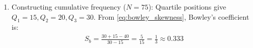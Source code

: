 \begin{enumerate}[label=\thesubsection.\arabic*, ref=\thesubsection.\theenumi]
\begin{enumerate}[label=\brak{\alph*}]
		Applying the inverse Laplace transform from \eqref{eq:inv_laplace_pairs} and \eqref{eq:laplace_second_order}:
		\begin{align}
			y\brak{t} = \brak{-\frac{1}{4} + 2e^t - \frac{3}{4}e^{2t} + \frac{1}{2}t e^{2t}}u\brak{t}
		\end{align}
		Substituting $t = \ln x$ ($e^t = x$, $x \ge 1$) yields:
		\begin{align}
			y\brak{x} = \frac{x^2}{2}\log x - \frac{3x^2}{4} + 2x - \frac{1}{4}, \quad x \ge 1
		\end{align}
		\item Constructing cumulative frequency ($N = 75$):
		Quartile positions give $Q_1 = 15, Q_2 = 20, Q_3 = 30$.
		From \eqref{eq:bowley_skewness}, Bowley's coefficient is:
		\begin{align}
			S_b = \frac{30 + 15 - 40}{30 - 15} = \frac{5}{15} = \frac{1}{3} \approx 0.333
		\end{align}
	\end{enumerate}
	

\end{enumerate}
